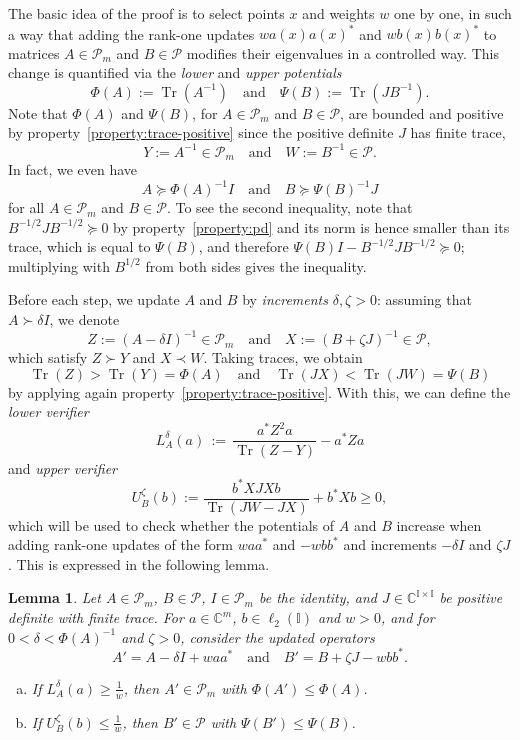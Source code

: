 \documentclass[a4paper,11pt]{article}
\renewcommand{\(}{\left (}
\renewcommand{\)}{\right )}
\newcommand{\<}{\langle}
\renewcommand{\>}{\rangle}
\newcommand{\C}{\mathbb{C}}
\newcommand{\II}{\mathbb{I}}
\newtheorem{lemma}[theorem]{Lemma}
\theoremstyle{definition}
\DeclareMathOperator{\Tr}{Tr}
\begin{document}
The basic idea of the proof is to select points $x$ and weights $w$ one by one,
in such a way that adding the rank-one updates $w a(x) a(x)^*$ and $wb(x)b(x)^*$ to matrices $A\in \mathcal P_m$ and $B\in \mathcal P$
modifies their eigenvalues in a controlled way.
This change is quantified via the \emph{lower} and \emph{upper potentials}
\[
\Phi(A):=\Tr(A^{-1})\quad\text{and}\quad \Psi(B):=\Tr(JB^{-1}).
\]
Note that $\Phi(A)$ and $\Psi(B)$, 
for $A\in \mathcal P_m$ and $B\in \mathcal P$,
are bounded and positive by property~\eqref{property:trace-positive} since 
the positive definite $J$ has finite trace,
\[
Y:=A^{-1}\in \mathcal P_m\quad\text{and}\quad W:=B^{-1}\in \mathcal P.
\]
In fact, we even have 
\[
A \succcurlyeq \Phi(A)^{-1} I
\quad\text{and}\quad
B \succcurlyeq \Psi(B)^{-1} J
\]
for all $A\in \mathcal P_m$ and $B\in \mathcal P$.
To see the second inequality, note that $B^{-1/2}JB^{-1/2} \succcurlyeq 0$ by property~\eqref{property:pd} and its norm is hence smaller than its trace, which is equal to $\Psi(B)$, and therefore $\Psi(B)I-B^{-1/2}JB^{-1/2} \succcurlyeq 0$;
multiplying with $B^{1/2}$ from both sides gives the inequality.

Before each step, we update $A$ and $B$ by \emph{increments} $\delta,\zeta>0$:
assuming that $A\succ \delta I$, we denote
\[
Z:=(A- \delta I)^{-1}\in \mathcal P_m \quad\text{and}\quad X:=(B+\zeta J)^{-1}\in \mathcal P,
\]
which satisfy $Z\succ Y$ and $X\prec W$. Taking traces, we obtain
\begin{equation}
\label{eq_comp_tr}
\Tr(Z)>\Tr(Y)=\Phi(A)
\quad\text{and}\quad
\Tr(JX)<\Tr(JW)=\Psi(B)
\end{equation}
by applying again property~\eqref{property:trace-positive}.
With this, we can define the \emph{lower verifier} 
\[
    L_A^{\delta}(a)
     \,:=\,\frac{a^*Z^2 a}{\Tr(Z-Y)}-a^*Za
\]
and \emph{upper verifier}
\[
U_B^{\zeta}(b)
    :=\frac{b^*X J Xb}{\Tr(JW-JX)}+b^*X b
     \ge 0, 
\]
which will be used to check 
whether the potentials of $A$ and $B$ increase when adding rank-one updates of the form $waa^*$ and $-w b  b^*$ and increments $-\delta I$ and $\zeta J$.
This is expressed in the following lemma. 

\smallskip

\begin{lemma}
\label{lemboth}
Let $A\in \mathcal P_m$, $B\in \mathcal P$,
$I\in\mathcal P_m$ be the identity, 
and $J\in\C^{\II\times\II}$ be positive definite with finite trace.
For $a\in \C^m$, $b\in\ell_2(\II)$ and $w>0$, 
and for $0<\delta<\Phi(A)^{-1}$ and $\zeta>0$,
consider the updated operators
\begin{equation*}
A'=A-\delta I+waa^*\quad\text{and}\quad B'=B+\zeta J-wbb^*.
\end{equation*}
\begin{enumerate}[a)]
    \item If $L_A^\delta(a) \ge \frac1w$,
    then $A' \in \mathcal P_m$ with $\Phi(A')\leq \Phi(A)$.
    \item If $U_B^\zeta(b) \le \frac1w$, then $B'\in \mathcal P$ with $\Psi(B')\leq \Psi(B)$.
\end{enumerate}
\end{lemma}
\end{document}
